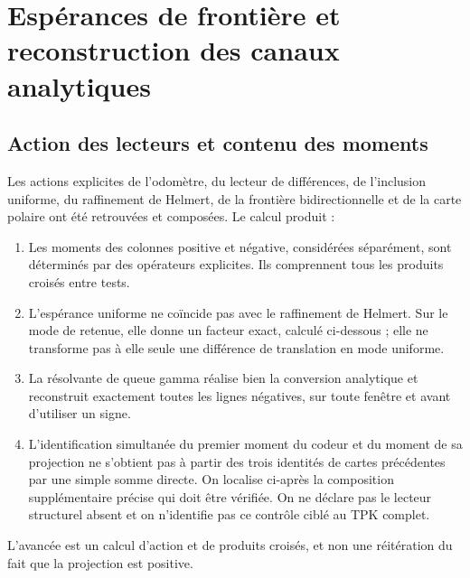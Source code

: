 \clearpage
\section[Espérances de frontière et reconstruction des canaux analytiques]{Espérances de frontière et\\reconstruction des canaux analytiques}
\label{viii:sec:lectores-gamma}


\subsection{Action des lecteurs et contenu des moments}
\label{viii:gamma-add-sub-5}

Les actions explicites de l'odomètre, du lecteur de différences, de l'inclusion uniforme, du raffinement de Helmert, de la frontière bidirectionnelle et de la carte polaire ont été retrouvées et composées. Le calcul produit :

\begin{enumerate}
\item Les moments des colonnes positive et négative, considérées séparément, sont déterminés par des opérateurs explicites. Ils comprennent tous les produits croisés entre tests.
\item L'espérance uniforme ne coïncide pas avec le raffinement de Helmert. Sur le mode de retenue, elle donne un facteur exact, calculé ci-dessous ; elle ne transforme pas à elle seule une différence de translation en mode uniforme.
\item La résolvante de queue gamma réalise bien la conversion analytique et reconstruit exactement toutes les lignes négatives, sur toute fenêtre et avant d'utiliser un signe.
\item L'identification simultanée du premier moment du codeur et du moment de sa projection ne s'obtient pas à partir des trois identités de cartes précédentes par une simple somme directe. On localise ci-après la composition supplémentaire précise qui doit être vérifiée. On ne déclare pas le lecteur structurel absent et on n'identifie pas ce contrôle ciblé au TPK complet.

\end{enumerate}
L'avancée est un calcul d'action et de produits croisés, et non une réitération du fait que la projection est positive.

